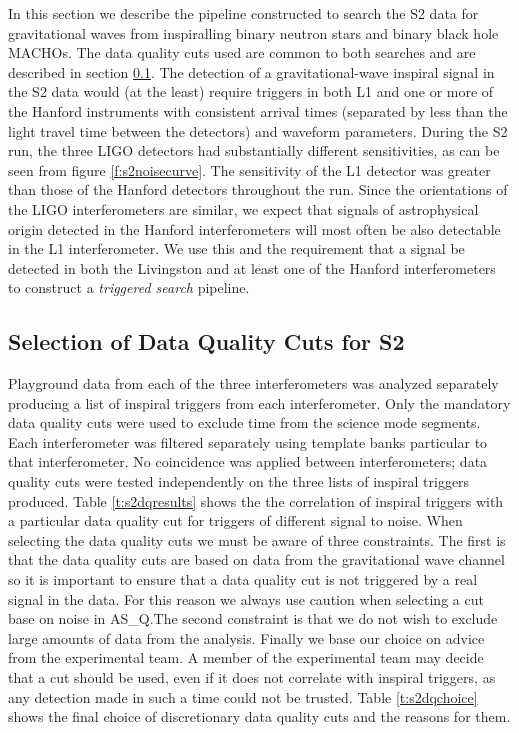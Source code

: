 In this section we describe the pipeline constructed to search the S2 data for
gravitational waves from inspiralling binary neutron stars and binary black
hole MACHOs. The data quality cuts used are common to both searches and are
described in section \ref{ss:s2dqselection}. The detection of a
gravitational-wave inspiral signal in the S2 data would (at the least) require
triggers in both L1 and one or more of the Hanford instruments with consistent
arrival times (separated by less than the light travel time between the
detectors) and waveform parameters. During the S2 run, the three LIGO
detectors had substantially different sensitivities, as can be seen from
figure \ref{f:s2noisecurve}. The sensitivity of the L1 detector was greater
than those of the Hanford detectors throughout the run. Since the orientations
of the LIGO interferometers are similar, we expect that signals of
astrophysical origin detected in the Hanford interferometers will most often
be also detectable in the L1 interferometer.  We use this and the requirement
that a signal be detected in both the Livingston and at least one of the
Hanford interferometers to construct a {\em triggered search} pipeline. 

\subsection{Selection of Data Quality Cuts for S2}
\label{ss:s2dqselection}

Playground data from each of the three interferometers was analyzed separately
producing a list of inspiral triggers from each interferometer. Only the
mandatory data quality cuts were used to exclude time from the science mode
segments. Each interferometer was filtered separately using template banks
particular to that interferometer. No coincidence was applied between
interferometers; data quality cuts were tested independently on the three
lists of inspiral triggers produced. Table \ref{t:s2dqresults} shows the the
correlation of inspiral triggers with a particular data quality cut for
triggers of different signal to noise. When selecting the data quality cuts we
must be aware of three constraints. The first is that the data quality cuts
are based on data from the gravitational wave channel so it is important to
ensure that a data quality cut is not triggered by a real signal in the data.
For this reason we always use caution when selecting a cut base on noise in
AS\_Q.\@ The second constraint is that we do not wish to exclude large amounts
of data from the analysis.  Finally we base our choice on advice from the
experimental team. A member of the experimental team may decide that a
cut should be used, even if it does not correlate with inspiral triggers, as
any detection made in such a time could not be trusted. Table
\ref{t:s2dqchoice} shows the final choice of discretionary data quality cuts
and the reasons for them.


